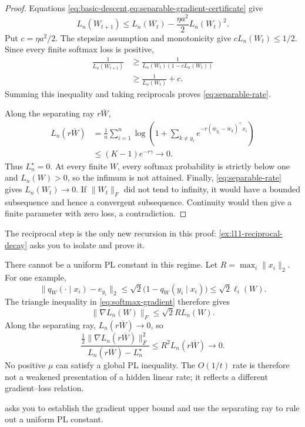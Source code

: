 \documentclass[11pt,twoside]{article}
\theoremstyle{definition}
\theoremstyle{remark}
\begin{document}
\begin{proof}
Equations \cref{eq:basic-descent,eq:separable-gradient-certificate} give
\[
 L_n(W_{t+1})
 \le L_n(W_t)-\frac{\eta a^2}{2}L_n(W_t)^2.
\]
Put $c=\eta a^2/2$. The stepsize assumption and monotonicity give
$cL_n(W_t)\le1/2$. Since every finite softmax loss is positive,
\begin{align*}
 \frac1{L_n(W_{t+1})}
 &\ge\frac1{L_n(W_t)(1-cL_n(W_t))}\\
 &\ge\frac1{L_n(W_t)}+c.
\end{align*}
Summing this inequality and taking reciprocals proves
\cref{eq:separable-rate}.

Along the separating ray $r\overline W$,
\begin{align*}
 L_n(r\overline W)
 &=\frac1n\sum_{i=1}^n
 \log\left(1+\sum_{k\ne y_i}
 e^{-r(\overline w_{y_i}-\overline w_k)^\top x_i}\right)\\
 &\le (K-1)e^{-r\gamma}\longrightarrow0.
\end{align*}
Thus $L_n^\star=0$. At every finite $W$, every softmax probability is
strictly below one and $L_n(W)>0$, so the infimum is not attained. Finally,
\cref{eq:separable-rate} gives $L_n(W_t)\to0$. If $\|W_t\|_F$ did not tend
to infinity, it would have a bounded subsequence and hence a convergent
subsequence. Continuity would then give a finite parameter with zero loss, a
contradiction.
\end{proof}

The reciprocal step is the only new recursion in this proof:
\cref{ex:l11-reciprocal-decay} asks you to isolate and prove it.

There cannot be a uniform PL constant in this regime. Let
$R=\max_i\|x_i\|_2$. For one example,
\[
 \|q_W(\cdot\mid x_i)-e_{y_i}\|_2
 \le\sqrt2\bigl(1-q_W(y_i\mid x_i)\bigr)
 \le\sqrt2\ell_i(W).
\]
The triangle inequality in \cref{eq:softmax-gradient} therefore gives
\begin{equation}
 \|\nabla L_n(W)\|_F\le\sqrt2R L_n(W).
 \label{eq:separable-gradient-upper}
\end{equation}
Along the separating ray, $L_n(r\overline W)\to0$, so
\[
 \frac{\frac12\|\nabla L_n(r\overline W)\|_F^2}
      {L_n(r\overline W)-L_n^\star}
 \le R^2L_n(r\overline W)\longrightarrow0.
\]
No positive $\mu$ can satisfy a global PL inequality. The $O(1/t)$ rate is
therefore not a weakened presentation of a hidden linear rate; it reflects a
different gradient--loss relation.

 asks you to establish the gradient upper bound and
use the separating ray to rule out a uniform PL constant.
\end{document}
